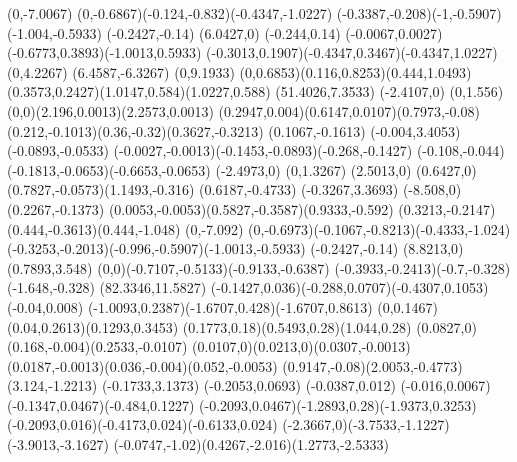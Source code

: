 {    \rlineto(0,-7.0067)
    \rcurveto(0,-0.6867)(-0.124,-0.832)(-0.4347,-1.0227)
    \rcurveto(-0.3387,-0.208)(-1,-0.5907)(-1.004,-0.5933)
    \rlineto(-0.2427,-0.14)
    \rlineto(6.0427,0)
    \rlineto(-0.244,0.14)
    \rcurveto(-0.0067,0.0027)(-0.6773,0.3893)(-1.0013,0.5933)
    \rcurveto(-0.3013,0.1907)(-0.4347,0.3467)(-0.4347,1.0227)
    \rlineto(0,4.2267)
    \rlineto(6.4587,-6.3267)
    \rlineto(0,9.1933)
    \rcurveto(0,0.6853)(0.116,0.8253)(0.444,1.0493)
    \rcurveto(0.3573,0.2427)(1.0147,0.584)(1.0227,0.588)
    \closepath
    \moveto(51.4026,7.3533)%
    \rlineto(-2.4107,0)
    \rlineto(0,1.556)
    \rcurveto(0,0)(2.196,0.0013)(2.2573,0.0013)
    \rcurveto(0.2947,0.004)(0.6147,0.0107)(0.7973,-0.08)
    \rcurveto(0.212,-0.1013)(0.36,-0.32)(0.3627,-0.3213)
    \rlineto(0.1067,-0.1613)
    \rlineto(-0.004,3.4053)
    \rlineto(-0.0893,-0.0533)
    \rcurveto(-0.0027,-0.0013)(-0.1453,-0.0893)(-0.268,-0.1427)
    \rcurveto(-0.108,-0.044)(-0.1813,-0.0653)(-0.6653,-0.0653)
    \rlineto(-2.4973,0)
    \rlineto(0,1.3267)
    \rlineto(2.5013,0)
    \rcurveto(0.6427,0)(0.7827,-0.0573)(1.1493,-0.316)
    \rlineto(0.6187,-0.4733)
    \rlineto(-0.3267,3.3693)
    \rlineto(-8.508,0)
    \rlineto(0.2267,-0.1373)
    \rcurveto(0.0053,-0.0053)(0.5827,-0.3587)(0.9333,-0.592)
    \rcurveto(0.3213,-0.2147)(0.444,-0.3613)(0.444,-1.048)
    \rlineto(0,-7.092)
    \rcurveto(0,-0.6973)(-0.1067,-0.8213)(-0.4333,-1.024)
    \rcurveto(-0.3253,-0.2013)(-0.996,-0.5907)(-1.0013,-0.5933)
    \rlineto(-0.2427,-0.14)
    \rlineto(8.8213,0)
    \rlineto(0.7893,3.548)
    \rcurveto(0,0)(-0.7107,-0.5133)(-0.9133,-0.6387)
    \rcurveto(-0.3933,-0.2413)(-0.7,-0.328)(-1.648,-0.328)
    \moveto(82.3346,11.5827)%
    \rcurveto(-0.1427,0.036)(-0.288,0.0707)(-0.4307,0.1053)
    \rlineto(-0.04,0.008)
    \rcurveto(-1.0093,0.2387)(-1.6707,0.428)(-1.6707,0.8613)
    \rcurveto(0,0.1467)(0.04,0.2613)(0.1293,0.3453)
    \rcurveto(0.1773,0.18)(0.5493,0.28)(1.044,0.28)
    \rcurveto(0.0827,0)(0.168,-0.004)(0.2533,-0.0107)
    \rcurveto(0.0107,0)(0.0213,0)(0.0307,-0.0013)
    \rcurveto(0.0187,-0.0013)(0.036,-0.004)(0.052,-0.0053)
    \rcurveto(0.9147,-0.08)(2.0053,-0.4773)(3.124,-1.2213)
    \rlineto(-0.1733,3.1373)
    \rlineto(-0.2053,0.0693)
    \rlineto(-0.0387,0.012)
    \rcurveto(-0.016,0.0067)(-0.1347,0.0467)(-0.484,0.1227)
    \rcurveto(-0.2093,0.0467)(-1.2893,0.28)(-1.9373,0.3253)
    \rcurveto(-0.2093,0.016)(-0.4173,0.024)(-0.6133,0.024)
    \rcurveto(-2.3667,0)(-3.7533,-1.1227)(-3.9013,-3.1627)
    \rcurveto(-0.0747,-1.02)(0.4267,-2.016)(1.2773,-2.5333)
}
